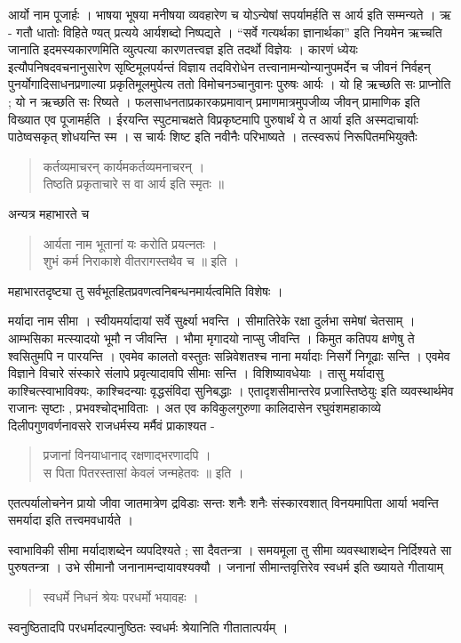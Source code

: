 आर्यो नाम पूजार्हः । भाषया भूषया मनीषया व्यवहारेण च योऽन्येषां सपर्यामर्हति स आर्य इति सम्मन्यते । ऋ - गतौ धातोः विहिते ण्यत् प्रत्यये आर्यशब्दो निष्पद्यते । “सर्वे गत्यर्थका ज्ञानार्थका” इति नियमेन ऋच्चति जानाति इदमस्यकारणमिति व्युत्पत्या कारणतत्त्वज्ञ इति तदर्थो विज्ञेयः । कारणं ध्येयः इत्यौपनिषदवचनानुसारेण सृष्टिमूलपर्यन्तं विज्ञाय तदविरोधेन तत्त्वानामन्योन्यानुपमर्देन च जीवनं निर्वहन् पुनर्योगादिसाधनप्रणाल्या प्रकृतिमूलमुपेत्य ततो विमोचनञ्चानुवानः पुरुषः आर्यः । यो हि ऋच्छति सः प्राप्नोति ; यो न ऋच्छति सः रिष्यते । फलसाधनताप्रकारकप्रमावान् प्रमाणमात्रमुपजीव्य जीवन् प्रामाणिक इति विख्यात एव पूजामर्हति । ईरयन्ति स्पुटमाचक्षते विप्रकृष्टमापि पुरुषार्थं ये त आर्या इति अस्मदाचार्याः पाठेष्वसकृत् शोधयन्ति स्म । स चार्यः शिष्ट इति नवीनैः परिभाष्यते । तत्स्वरूपं निरूपितमभियुक्तैः 
\begin{verse}
कर्तव्यमाचरन् कार्यमकर्तव्यमनाचरन् ।\\
तिष्ठति प्रकृताचारे स वा आर्य इति स्मृतः ॥
\end{verse}
अन्यत्र महाभारते च  
\begin{verse}
आर्यता नाम भूतानां यः करोति प्रयत्नतः ।\\
शुभं कर्म निराकाशे वीतरागस्तथैव च ॥ इति ।
\end{verse}
महाभारतदृष्ट्या तु सर्वभूतहितप्रवणत्वनिबन्धनमार्यत्वमिति विशेषः ।

मर्यादा नाम सीमा । स्वीयमर्यादायां सर्वे सुर्क्ष्या भवन्ति । सीमातिरेके रक्षा दुर्लभा समेषां चेतसाम् । आम्भसिका मत्स्यादयो भूमौ न जीवन्ति । भौमा मृगादयो नाप्सु जीवन्ति । किमुत कतिपय क्षणेषु ते श्वसितुमपि न पारयन्ति । एवमेव कालतो वस्तुतः सन्निवेशतश्च नाना मर्यादाः निसर्गे निगूढाः सन्ति । एवमेव विज्ञाने विचारे संस्कारे संलापे प्रवृत्यादावपि सीमाः सन्ति । विशिष्यावधेयाः । तासु मर्यादासु काश्चित्स्वाभाविक्यः, काश्चिदन्याः वृद्धसंविदा सुनिबद्धाः । एतादृशसीमान्तरेव प्रजास्तिष्ठेयुः इति व्यवस्थार्थमेव राजानः सृष्टाः , प्रभवश्चोद्भाविताः । अत एव कविकुलगुरुणा कालिदासेन रघुवंशमहाकाव्ये दिलीपगुणवर्णनावसरे राजधर्मस्य मर्मैवं प्राकाश्यत -
\begin{verse}
प्रजानां विनयाधानाद् रक्षणाद्भरणादपि ।\\ 
स पिता पितरस्तासां केवलं जन्महेतवः ॥ इति ।
\end{verse}
एतत्पर्यालोचनेन प्रायो जीवा जातमात्रेण द्रविडाः सन्तः शनैः शनैः संस्कारवशात् विनयमापिता आर्या भवन्ति समर्यादा इति तत्त्वमवधार्यते ।

स्वाभाविकी सीमा मर्यादाशब्देन व्यपदिश्यते ; सा दैवतन्त्रा । समयमूला तु सीमा व्यवस्थाशब्देन निर्दिश्यते सा पुरुषतन्त्रा ।  उभे सीमानौ जनानामन्दायावश्यक्यौ । जनानां सीमान्तवृत्तिरेव स्वधर्म इति ख्यायते गीतायाम्  
\begin{verse}
स्वधर्मे निधनं श्रेयः परधर्मो भयावहः । 
\end{verse}
स्वनुष्ठितादपि परधर्मादल्पानुष्ठितः स्वधर्मः श्रेयानिति गीतातात्पर्यम् ।

